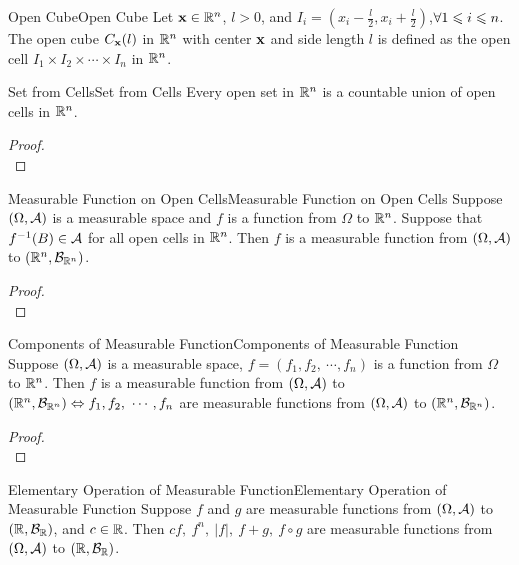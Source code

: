 \documentclass{elegantbook}
\begin{document}
\begin{definition}{Open Cube}{Open Cube}
Let $\mathbf{x}\in\mathbb{R}^n$, $l>0$, and $I_i=\left(x_i-\frac{l}{2},x_i+\frac{l}{2}\right)$,$\forall1\leqslant i\leqslant n$. The open cube $C_{\mathbf{x}}(l)$ in $\mathbb{R}^n$ with center $\mathbf{x}$ and side length $l$ is def\/ined as the open cell $I_1\times I_2\times\cdots\times I_n$  in $\mathbb{R}^n$.
\end{definition}

\begin{theorem}{Set from Cells}{Set from Cells}
Every open set in $\mathbb{R}^n$ is a countable union of open cells in $\mathbb{R}^n$.
\end{theorem}

\begin{proof}
\\[4cm]\vspace{0.01cm}
\end{proof}

\begin{theorem}{Measurable Function on Open Cells}{Measurable Function on Open Cells}
Suppose $(\Omega,\mathcal{A})$ is a measurable space and $f$ is a function from $\Omega$ to $\mathbb{R}^n$. Suppose that $f^{-1}(B)\in\mathcal{A}$ for all open cells in $\mathbb{R}^n$. Then $f$ is a measurable function from $(\Omega,\mathcal{A})$ to $(\mathbb{R}^n,\mathcal{B}_{\mathbb{R}^n})$.
\end{theorem}

\begin{proof}
\\[4cm]\vspace{0.01cm}
\end{proof}

\begin{theorem}{Components of Measurable Function}{Components of Measurable Function}
Suppose $(\Omega,\mathcal{A})$ is a measurable space,  $f=(f_1,f_2,\ \cdots,f_n )$  is a function from $\Omega$ to $\mathbb{R}^n$. Then $f$ is a measurable function from  $(\Omega,\mathcal{A})$ to $(\mr^n,\mb_{\mr^n})\Leftrightarrow f_1,f_2,\ \cdots,f_n$ are measurable functions from $(\Omega,\mathcal{A})$ to $(\mathbb{R}^n,\mathcal{B}_{\mathbb{R}^n})$.
\end{theorem}

\begin{proof}
\\[4cm]\vspace{0.01cm}
\end{proof}

\begin{theorem}{Elementary Operation of Measurable Function}{Elementary Operation of Measurable Function}
Suppose $f$ and $g$ are measurable functions from $(\Omega,\mathcal{A})$ to $(\mathbb{R},\mathcal{B}_{\mathbb{R}})$, and $c\in\mathbb{R}$. Then $cf,\ f^n,\ |f|,\ f+g,\ f\circ g$ are measurable functions from $(\Omega,\mathcal{A})$ to $(\mathbb{R},\mathcal{B}_{\mathbb{R}})$.
\end{theorem}
\end{document}
